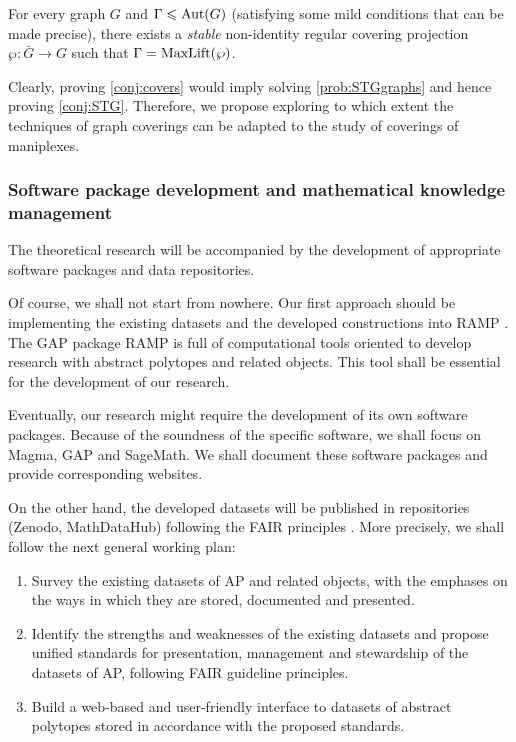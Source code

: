 \documentclass[a4paper,12pt,english]{article}
\begin{document}
\begin{conj}\label{conj:covers}
  For every graph $G$  and $\Gamma \leqslant \operatorname{Aut}(G)$ (satisfying some mild conditions that can be made precise), there exists a \emph{ stable} non-identity regular covering projection $\wp \colon \bar{G} \to G$ 
such that $\Gamma = \operatorname{MaxLift}(\wp)$.
\end{conj}

Clearly, proving \cref{conj:covers} would imply solving \cref{prob:STGgraphs} and hence proving \cref{conj:STG}. Therefore, we propose exploring to which extent the techniques of graph coverings can be adapted to the study of coverings of maniplexes. 


\subsubsection*{Software package development and mathematical knowledge management}

The theoretical research will be accompanied by the development of appropriate software packages and data repositories. 

Of course, we shall not start from nowhere. Our first approach should be implementing the existing datasets and the developed constructions into RAMP \cite{CunnMixWil2022_RampResearchAssistant}. 
The GAP package RAMP is full of computational tools oriented to develop research with abstract polytopes and related objects. 
This tool shall be essential for the development of our research. 

Eventually, our research might require the development of its own software packages. Because of the soundness of the specific software, we shall focus on Magma, GAP and SageMath. We shall document these software packages and provide corresponding websites.

On the other hand, the developed datasets will be published in repositories (Zenodo, MathDataHub) following the FAIR principles \cite{BercKohRab2020_DeepFairMathematics,WDAAABBBSB2016_FairGuidingPrinciples}. 
More precisely, we shall follow the next general working plan:

\begin{enumerate}
    \item  Survey the existing datasets of AP and related objects, with the emphases on the ways in which they are stored, documented and presented.
   \item Identify the strengths and weaknesses of the existing datasets and propose unified standards for presentation, management and stewardship of the datasets of AP, following FAIR guideline principles.
\item Build a web-based and user-friendly interface to datasets of abstract polytopes stored in accordance with the proposed standards.
\end{enumerate}
\end{document}
